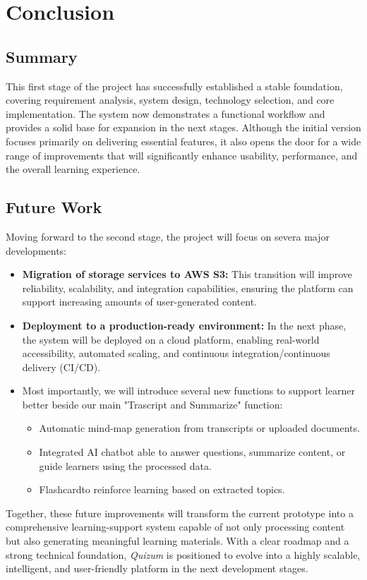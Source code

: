 \chapter{Conclusion}
\section{Summary}
This first stage of the project has successfully established a stable foundation, covering requirement analysis, system design, technology selection, and core implementation. The system now demonstrates a functional workflow and provides a solid base for expansion in the next stages. Although the initial version focuses primarily on delivering essential features, it also opens the door for a wide range of improvements that will significantly enhance usability, performance, and the overall learning experience.

\section{Future Work}
Moving forward to the second stage, the project will focus on severa major developments:
\begin{itemize}
    \item \textbf{Migration of storage services to AWS S3:} This transition will improve reliability, scalability, and integration capabilities, ensuring the platform can support increasing amounts of user-generated content.
    \item \textbf{Deployment to a production-ready environment:} In the next phase, the system will be deployed on a cloud platform, enabling real-world accessibility, automated scaling, and continuous integration/continuous delivery (CI/CD). 
    \item Most importantly, we will introduce several new functions to support learner better beside our main "Trascript and Summarize" function:
    \begin{itemize}
        \item Automatic mind-map generation from transcripts or uploaded documents.
        \item Integrated AI chatbot able to answer questions, summarize content, or guide learners using the processed data.
        \item Flashcardto reinforce learning based on extracted topics.
    \end{itemize}
\end{itemize}
Together, these future improvements will transform the current prototype into a comprehensive learning-support system capable of not only processing content but also generating meaningful learning materials. With a clear roadmap and a strong technical foundation, \textit{Quizum} is positioned to evolve into a highly scalable, intelligent, and user-friendly platform in the next development stages.

